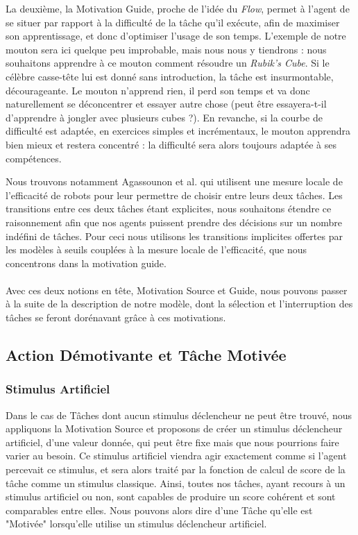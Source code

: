         La deuxième, la Motivation Guide, proche de l'idée du \textit{Flow}, permet à l'agent de se situer par rapport à la difficulté de la tâche qu'il exécute, afin de maximiser son apprentissage, et donc d'optimiser l'usage de son temps. L'exemple de notre mouton sera ici quelque peu improbable, mais nous nous y tiendrons : nous souhaitons apprendre à ce mouton comment résoudre un \textit{Rubik's Cube}. Si le célèbre casse-tête lui est donné sans introduction, la tâche est insurmontable, décourageante. Le mouton n'apprend rien, il perd son temps et va donc naturellement se déconcentrer et essayer autre chose (peut être essayera-t-il d'apprendre à jongler avec plusieurs cubes ?). En revanche, si la courbe de difficulté est adaptée, en exercices simples et incrémentaux, le mouton apprendra bien mieux et restera concentré : la difficulté sera alors toujours adaptée à ses compétences.
        
        Nous trouvons notamment Agassounon et al. \cite{agassounon_scalable_2001} qui utilisent une mesure locale de l'efficacité de robots pour leur permettre de choisir entre leurs deux tâches. Les transitions entre ces deux tâches étant explicites, nous souhaitons étendre ce raisonnement afin que nos agents puissent prendre des décisions sur un nombre indéfini de tâches. Pour ceci nous utilisons les transitions implicites offertes par les modèles à seuils couplées à la mesure locale de l'efficacité, que nous concentrons dans la motivation guide.
        
        \paragraph{}
        Avec ces deux notions en tête, Motivation Source et Guide, nous pouvons passer à la suite de la description de notre modèle, dont la sélection et l'interruption des tâches se feront dorénavant grâce à ces motivations.
        
        
		\subsection{Action Démotivante et Tâche Motivée}
		\label{sectionInterruption}
		
		\subsubsection{Stimulus Artificiel}
			Dans le cas de Tâches dont aucun stimulus déclencheur ne peut être trouvé, nous appliquons la Motivation Source et proposons de créer un stimulus déclencheur artificiel, d'une valeur donnée, qui peut être fixe mais que nous pourrions faire varier au besoin. Ce stimulus artificiel viendra agir exactement comme si l'agent percevait ce stimulus, et sera alors traité par la fonction de calcul de score de la tâche comme un stimulus classique. Ainsi, toutes nos tâches, ayant recours à un stimulus artificiel ou non, sont capables de produire un score cohérent et sont comparables entre elles. Nous pouvons alors dire d'une Tâche qu'elle est "Motivée" lorsqu'elle utilise un stimulus déclencheur artificiel.
			
